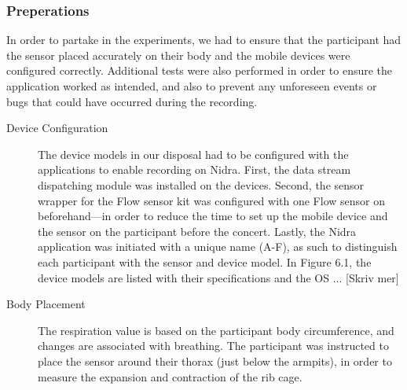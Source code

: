 \subsubsection{Preperations}

\begin{table}
\begin{center}
\caption{Device models used during the concert}
\end{center}
\end{table}

In order to partake in the experiments, we had to ensure that the participant had the sensor placed accurately on their body and the mobile devices were configured correctly. Additional tests were also performed in order to ensure the application worked as intended, and also to prevent any unforeseen events or bugs that could have occurred during the recording. 

\begin{description}
    \item[Device Configuration] The device models in our disposal had to be configured with the applications to enable recording on Nidra. First, the data stream dispatching module was installed on the devices. Second, the sensor wrapper for the Flow sensor kit was configured with one Flow sensor on beforehand---in order to reduce the time to set up the mobile device and the sensor on the participant before the concert. Lastly, the Nidra application was initiated with a unique name (A-F), as such to distinguish each participant with the sensor and device model. In Figure 6.1, the device models are listed with their specifications and the OS ... [Skriv mer]
    \item[Body Placement] The respiration value is based on the participant body circumference, and changes are associated with breathing. The participant was instructed to place the sensor around their thorax (just below the armpits), in order to measure the expansion and contraction of the rib cage.

\end{description}

